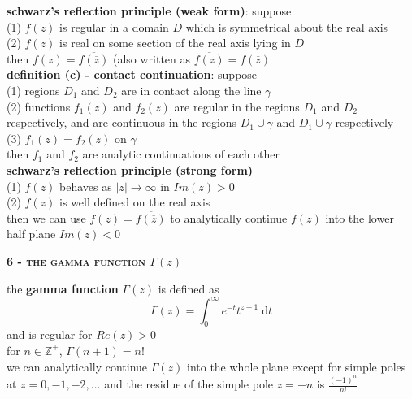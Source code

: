 \documentclass[a4paper]{article}
\newcommand\abs[1]{\ensuremath{\lvert#1\rvert}}
\begin{document}
\begin{multicols}{2}
\begin{framed}
	\noindent
	\textbf{schwarz's reflection principle (weak form)}: suppose\\
	(1) $f(z)$ is regular in a domain $D$ which is symmetrical about the real axis\\
	(2) $f(z)$ is real on some section of the real axis lying in $D$\\
	then $f(z) = \overline{f(\overline{z})}$ (also written as $\overline{f(z)} = f(\overline{z})$\\
	
	\noindent
	\textbf{definition (c) - contact continuation}: suppose\\
	(1) regions $D_1$ and $D_2$ are in contact along the line $\gamma$\\
	(2) functions $f_1(z)$ and $f_2(z)$ are regular in the regions $D_1$ and $D_2$ respectively, and are continuous in the regions $D_1 \cup \gamma$ and $D_1 \cup \gamma$ respectively\\
	(3) $f_1(z) = f_2(z)$ on $\gamma$\\
	then $f_1$ and $f_2$ are analytic continuations of each other\\
	
	\noindent
	\textbf{schwarz's reflection principle (strong form)}\\
	(1) $f(z)$ behaves as $\abs{z} \rightarrow \infty$ in $Im(z) >0$\\
	(2) $f(z)$ is well defined on the real axis\\
	then we can use $f(z) = \overline{f(\overline{z})}$ to analytically continue $f(z)$ into the lower half plane $Im(z) < 0$
\end{framed}

\begin{framed}
	\begin{center}
		\textbf{\textsc{6 - the gamma function $\Gamma(z)$}}
	\end{center}
	
	\noindent
	the \textbf{gamma function} $\Gamma(z)$ is defined as
	$$\Gamma(z) = \int^\infty_0 e^{-t} t^{z-1} \; \mathrm{d}t$$
	and is regular for $Re(z) > 0$\\
	
	\noindent
	for $n \in \mathbb{Z}^+$, $\Gamma(n+1) = n!$\\
	
	\noindent
	we can analytically continue $\Gamma(z)$ into the whole plane except for simple poles at $z = 0, -1, -2, \dots$ and the residue of the simple pole $z = -n$ is $\frac{(-1)^n}{n!}$\\
	

\end{framed}
\end{multicols}
\end{document}
